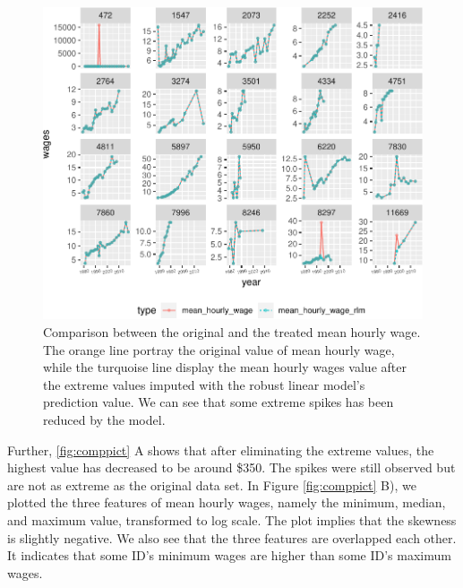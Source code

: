 \documentclass{article}
\begin{document}
\begin{figure}
\centering
\includegraphics{figures/compare-plot-1.pdf}
\caption{\label{fig:compare-plot}Comparison between the original and the treated mean hourly wage. The orange line portray the original value of mean hourly wage, while the turquoise line display the mean hourly wages value after the extreme values imputed with the robust linear model's prediction value. We can see that some extreme spikes has been reduced by the model.}
\end{figure}

Further, \ref{fig:comppict} A shows that after eliminating the extreme values, the highest value has decreased to be around \$350. The spikes were still observed but are not as extreme as the original data set. In Figure \ref{fig:comppict} B), we plotted the three features of mean hourly wages, namely the minimum, median, and maximum value, transformed to log scale. The plot implies that the skewness is slightly negative. We also see that the three features are overlapped each other. It indicates that some ID's minimum wages are higher than some ID's maximum wages.
\end{document}
